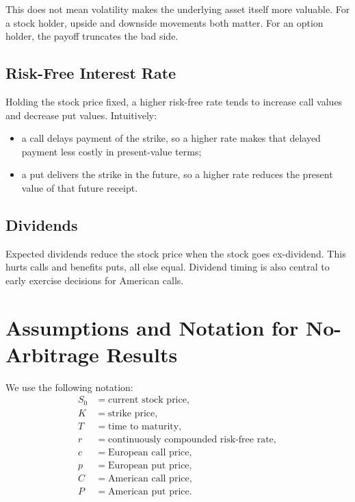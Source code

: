 This does not mean volatility makes the underlying asset itself more valuable.
For a stock holder, upside and downside movements both matter. For an option
holder, the payoff truncates the bad side.

\subsection{Risk-Free Interest Rate}

Holding the stock price fixed, a higher risk-free rate tends to increase call
values and decrease put values. Intuitively:
\begin{itemize}
    \item a call delays payment of the strike, so a higher rate makes that
    delayed payment less costly in present-value terms;
    \item a put delivers the strike in the future, so a higher rate reduces the
    present value of that future receipt.
\end{itemize}

\subsection{Dividends}

Expected dividends reduce the stock price when the stock goes ex-dividend. This
hurts calls and benefits puts, all else equal. Dividend timing is also central
to early exercise decisions for American calls.

\section{Assumptions and Notation for No-Arbitrage Results}

We use the following notation:
\[
\begin{aligned}
    S_0 & = \text{current stock price},\\
    K & = \text{strike price},\\
    T & = \text{time to maturity},\\
    r & = \text{continuously compounded risk-free rate},\\
    c & = \text{European call price},\\
    p & = \text{European put price},\\
    C & = \text{American call price},\\
    P & = \text{American put price}.
\end{aligned}
\]

